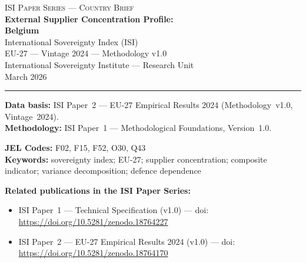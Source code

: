 \documentclass[12pt,a4paper]{article}
\begin{document}
\hypersetup{pageanchor=false}

\begin{titlepage}
\centering
\vspace*{2cm}
{\Large\textsc{ISI Paper Series --- Country Brief}}\\[1.2cm]
{\LARGE\bfseries External Supplier Concentration Profile:\\[0.3em]
Belgium}\\[1.5cm]
{\large International Sovereignty Index (ISI)\\[0.3em]
EU-27 --- Vintage 2024 --- Methodology v1.0}\\[1.2cm]
{\large International Sovereignty Institute --- Research Unit}\\[0.8cm]
{\large March 2026}

\vspace{0.8cm}
\noindent\rule{\textwidth}{0.4pt}
\vspace{0.4cm}

\begin{flushleft}
\noindent\textbf{Data basis:} ISI Paper~2 --- EU-27 Empirical Results 2024 (Methodology~v1.0, Vintage~2024).\\[4pt]
\noindent\textbf{Methodology:} ISI Paper~1 --- Methodological Foundations, Version~1.0.

\medskip

\noindent\textbf{JEL Codes:} F02, F15, F52, O30, Q43\\[4pt]
\noindent\textbf{Keywords:} sovereignty index; EU-27; supplier concentration; composite indicator; variance decomposition; defence dependence

\medskip

\noindent\textbf{Related publications in the ISI Paper Series:}
\begin{itemize}[nosep,leftmargin=1.5em]
\item ISI Paper~1 --- Technical Specification (v1.0) --- doi:\\
  \url{https://doi.org/10.5281/zenodo.18764227}
\item ISI Paper~2 --- EU-27 Empirical Results 2024 (v1.0) --- doi:\\
  \url{https://doi.org/10.5281/zenodo.18764170}
\end{itemize}
\end{flushleft}
\vfill
\end{titlepage}
\end{document}
